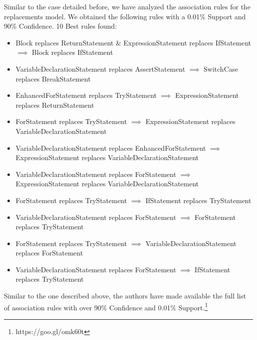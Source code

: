\documentclass[conference]{IEEEtran}
\begin{document}
Similar to the case detailed before, we have analyzed the association rules for the replacements model. We obtained the following rules with a 0.01\% Support and 90\% Confidence.
10 Best rules found:
\begin{itemize}
\item Block replaces ReturnStatement \& ExpressionStatement replaces IfStatement $\implies$ Block replaces IfStatement
\item VariableDeclarationStatement replaces AssertStatement $\implies$ SwitchCase replaces BreakStatement
\item EnhancedForStatement replaces TryStatement $\implies$ ExpressionStatement replaces ReturnStatement
\item ForStatement replaces TryStatement $\implies$ ExpressionStatement replaces VariableDeclarationStatement
\item VariableDeclarationStatement replaces EnhancedForStatement $\implies$ ExpressionStatement replaces VariableDeclarationStatement
\item VariableDeclarationStatement replaces ForStatement $\implies$ ExpressionStatement replaces VariableDeclarationStatement
\item ForStatement replaces TryStatement $\implies$ IfStatement replaces TryStatement
\item VariableDeclarationStatement replaces ForStatement $\implies$ ForStatement replaces TryStatement
\item ForStatement replaces TryStatement $\implies$ VariableDeclarationStatement replaces ForStatement
\item VariableDeclarationStatement replaces ForStatement $\implies$ IfStatement replaces TryStatement
\end{itemize}

Similar to the one described above, the authors have made available the full list of association rules with over 90\% Confidence and 0.01\% Support.\footnote{https://goo.gl/omk60t}



\end{document}
